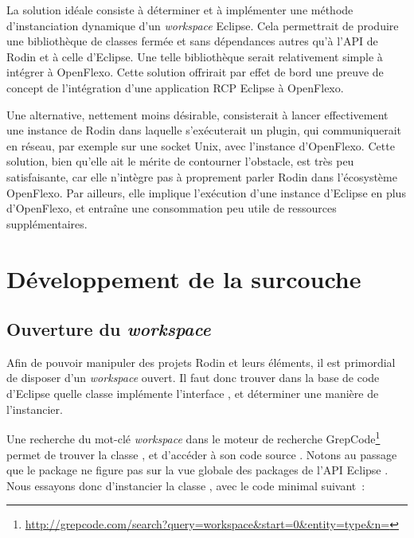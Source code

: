 La solution idéale consiste à déterminer et à implémenter une méthode d'instanciation dynamique d'un \textit{workspace} Eclipse.
Cela permettrait de produire une bibliothèque de classes fermée et sans dépendances autres qu'à l'API de Rodin et à celle d'Eclipse.
Une telle bibliothèque serait relativement simple à intégrer à OpenFlexo.
Cette solution offrirait par effet de bord une preuve de concept de l'intégration d'une application RCP Eclipse à OpenFlexo.

Une alternative, nettement moins désirable, consisterait à lancer effectivement une instance de Rodin dans laquelle s'exécuterait un plugin, qui communiquerait %
en réseau, par exemple sur une socket Unix, avec l'instance d'OpenFlexo.
Cette solution, bien qu'elle ait le mérite de contourner l'obstacle, est très peu satisfaisante, car elle n'intègre pas à proprement parler Rodin dans l'écosystème OpenFlexo.
Par ailleurs, elle implique l'exécution d'une instance d'Eclipse en plus d'OpenFlexo, et entraîne une consommation peu utile de ressources supplémentaires.


\section{Développement de la surcouche}


\subsection{Ouverture du \textit{workspace}}

Afin de pouvoir manipuler des projets Rodin et leurs éléments, il est primordial de disposer d'un \textit{workspace} ouvert.
Il faut donc trouver dans la base de code d'Eclipse quelle classe implémente l'interface , et déterminer une manière de l'instancier.

Une recherche du mot-clé \textit{workspace} dans le moteur de recherche GrepCode\footnote{%
\url{http://grepcode.com/search?query=workspace&start=0&entity=type&n=}} %
permet de trouver la classe , et d'accéder à son code source \cite{eclipseworkspace}.
Notons au passage que le package  ne figure pas sur la vue globale des packages de l'API Eclipse \cite{eclipseapioverview}.
Nous essayons donc d'instancier la classe , avec le code minimal suivant~:

